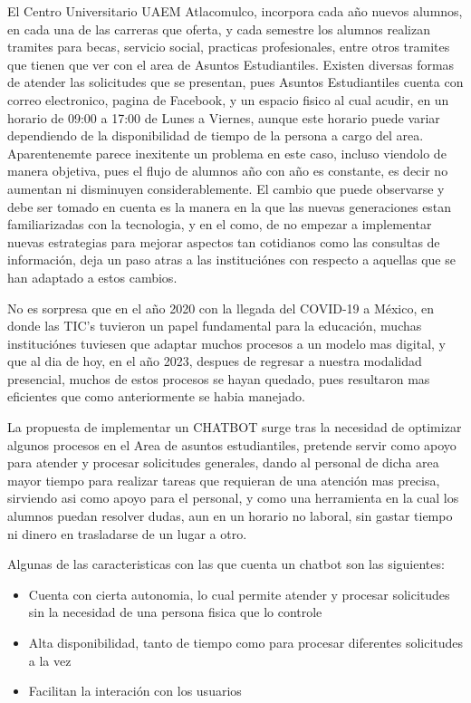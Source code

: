 El Centro Universitario UAEM Atlacomulco, incorpora cada año nuevos alumnos, en cada una de las carreras que oferta, y cada semestre los alumnos realizan tramites para becas, servicio social, practicas profesionales, entre otros tramites que tienen que ver con el area de Asuntos Estudiantiles. Existen diversas formas de atender las solicitudes que se presentan, pues Asuntos Estudiantiles cuenta con correo electronico, pagina de Facebook, y un espacio fisico al cual acudir, en un horario de 09:00 a 17:00 de Lunes a Viernes, aunque este horario puede variar dependiendo de la disponibilidad de tiempo de la persona a cargo del area. Aparentenemte parece inexitente un problema en este caso, incluso viendolo de manera objetiva, pues el flujo de alumnos año con año es constante, es decir no aumentan ni disminuyen considerablemente. El cambio que puede observarse y debe ser tomado en cuenta es la manera en la que las nuevas generaciones estan familiarizadas con la tecnologia, y en el como, de no empezar a implementar nuevas estrategias para mejorar aspectos tan cotidianos como las consultas de información, deja un paso atras a las instituciónes con respecto a aquellas que se han adaptado a estos cambios.

No es sorpresa que en el año 2020 con la llegada del COVID-19 a México, en donde las TIC's tuvieron un papel fundamental para la educación, muchas instituciónes tuviesen que adaptar muchos procesos a un modelo mas digital, y que al dia de hoy, en el año 2023, despues de regresar a nuestra modalidad presencial, muchos de estos procesos se hayan quedado, pues resultaron mas eficientes que como anteriormente se habia manejado.

La propuesta de implementar un CHATBOT surge tras la necesidad de optimizar algunos procesos en el Area de asuntos estudiantiles, pretende servir como apoyo para atender y procesar solicitudes generales, dando al personal de dicha area mayor tiempo para realizar tareas que requieran de una atención mas precisa, sirviendo asi como apoyo para el personal, y como una herramienta en la cual los alumnos puedan resolver dudas, aun en un horario no laboral, sin gastar tiempo ni dinero en trasladarse de un lugar a otro.

Algunas de las caracteristicas con las que cuenta un chatbot son las siguientes:
\begin{itemize}
	\item Cuenta con cierta autonomia, lo cual permite atender y procesar solicitudes sin la necesidad de una persona fisica que lo controle
	\item Alta disponibilidad, tanto de tiempo como para procesar diferentes solicitudes a la vez
	\item Facilitan la interación con los usuarios
\end{itemize}

